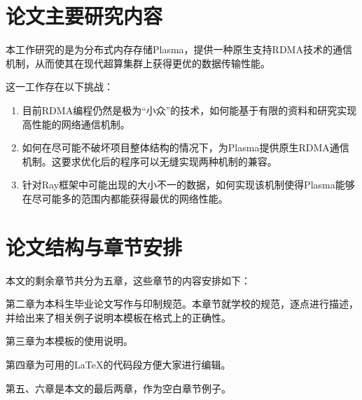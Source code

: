 \section{论文主要研究内容}

本工作研究的是为分布式内存存储Plasma，提供一种原生支持RDMA技术的通信机制，从而使其在现代超算集群上获得更优的数据传输性能。

这一工作存在以下挑战：

\begin{enumerate}
	\item 目前RDMA编程仍然是极为“小众”的技术，如何能基于有限的资料和研究实现高性能的网络通信机制。
	\item 如何在尽可能不破坏项目整体结构的情况下，为Plasma提供原生RDMA通信机制。这要求优化后的程序可以无缝实现两种机制的兼容。
	\item 针对Ray框架中可能出现的大小不一的数据，如何实现该机制使得Plasma能够在尽可能多的范围内都能获得最优的网络性能。
\end{enumerate}

\section{论文结构与章节安排}
\label{sec:arrangement}

本文的剩余章节共分为五章，这些章节的内容安排如下：

第二章为本科生毕业论文写作与印制规范。本章节就学校的规范，逐点进行描述，并给出来了相关例子说明本模板在格式上的正确性。

第三章为本模板的使用说明。

第四章为可用的\LaTeX 的代码段方便大家进行编辑。

第五、六章是本文的最后两章，作为空白章节例子。

